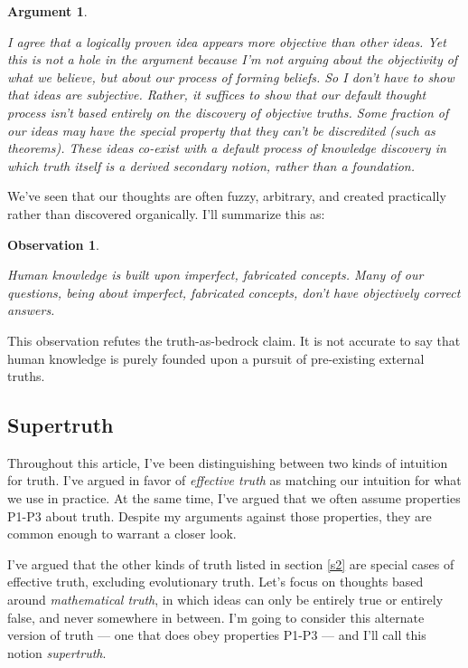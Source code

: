 \documentclass[11pt, oneside]{article}
\newtheorem{obs}{Observation}
\newtheorem*{argt}{Argument}
\begin{document}
\begin{argt}
\begin{itemize}
        I agree that a logically proven idea appears more objective than other
        ideas.
        Yet this is not a hole in the argument because I'm not arguing about the
        objectivity of what we believe, but about our process of forming
        beliefs.
        So I don't have to show that ideas are subjective.
        Rather, it suffices to show that our default thought process isn't based
        entirely on the discovery of objective truths.
        Some fraction of our
        ideas may have the special property that they can't be discredited
        (such as theorems).
        These ideas co-exist with a default process of knowledge discovery in
        which truth itself is a derived secondary notion, rather than a
        foundation.
\end{itemize}
\end{argt}

We've seen that our thoughts are often fuzzy, arbitrary, and created practically
rather than discovered organically. I'll summarize this as:
\newcommand{\obsnine}{
Human knowledge is
built upon imperfect, fabricated concepts.
Many of our questions, being about imperfect,
fabricated concepts,
don't have objectively correct answers.
}
\begin{obs}\label{o9}
    \obsnine
\end{obs}

This observation refutes the truth-as-bedrock claim.
It is not accurate to say that human knowledge is purely founded upon a
pursuit of pre-existing external truths.

\subsection{Supertruth}\label{supertruth}

Throughout this article, I've been distinguishing between two kinds of intuition
for truth.
I've argued in favor of {\em effective truth} as matching our intuition for what
we use in practice.
At the same time, I've argued that we often assume properties P1-P3 about truth.
Despite my arguments against those properties, they are common enough to warrant
a closer look.

I've argued that the other kinds of truth listed in section \ref{s2}
are special cases of effective truth, excluding evolutionary truth.
Let's focus on thoughts based around {\em mathematical truth}, in which ideas
can only be
entirely true or entirely false, and never somewhere in between.
I'm going to consider this alternate version
of truth --- one that does obey properties P1-P3 --- and I'll call this notion
{\em supertruth}.
\end{document}
